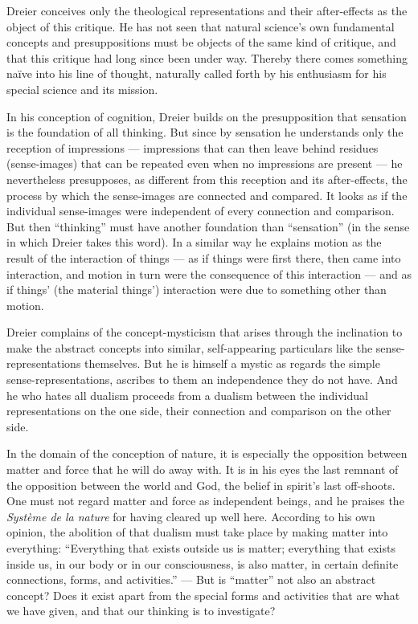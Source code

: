 \documentclass[12pt,a4paper]{book}
\newcommand{\opage}[1]{\marginnote{\footnotesize\textit{[#1]}}}
\begin{document}
Dreier conceives only the theological representations and their after-effects as the object of
this critique. He has not seen that natural science's own fundamental concepts and
presuppositions must be objects of the same kind of critique, and that this critique had long
since been under way. Thereby there comes something naïve into his line of thought, naturally
called forth by his enthusiasm for his special science and its mission.

In his conception of cognition, Dreier builds on the presupposition that sensation is the
foundation of all thinking. But since by sensation he understands only the reception of
impressions --- impressions that can then leave behind residues (sense-images) that can be
repeated even when no impressions are present --- he nevertheless presupposes, as different
from this reception and its \opage{179}after-effects, the process by which the sense-images are connected
and compared. It looks as if the individual sense-images were independent of every connection
and comparison. But then ``thinking'' must have another foundation than ``sensation'' (in the
sense in which Dreier takes this word). In a similar way he explains motion as the result of
the interaction of things --- as if things were first there, then came into interaction, and
motion in turn were the consequence of this interaction --- and as if things' (the material
things') interaction were due to something other than motion.

Dreier complains of the concept-mysticism that arises through the inclination to make the
abstract concepts into similar, self-appearing particulars like the sense-representations
themselves. But he is himself a mystic as regards the simple sense-representations, ascribes
to them an independence they do not have. And he who hates all dualism proceeds from a
dualism between the individual representations on the one side, their connection and
comparison on the other side.

In the domain of the conception of nature, it is especially the opposition between matter and
force that he will do away with. It is in his eyes the last remnant of the opposition between
the world and God, the belief in spirit's last off-shoots. One must not regard matter and
force as independent beings, and he praises the \emph{Système de la nature} for having
cleared up well here. According to his own opinion, the abolition of that dualism must take
place by making matter into everything: ``Everything that exists outside us is matter;
everything that exists inside us, in our body or in our consciousness, is also matter, in
certain definite connections, forms, and activities.'' --- But is ``matter'' not also an
abstract concept? Does it exist apart from the special forms and activities that are what we
have given, and that our thinking is to investigate?
\end{document}
